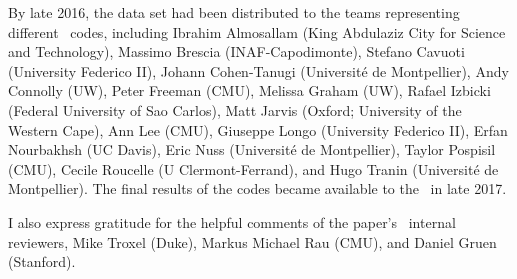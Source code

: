 By late 2016, the data set had been distributed to the teams representing different \pzpdf\ codes, including Ibrahim Almosallam (King Abdulaziz City for Science and Technology), Massimo Brescia (INAF-Capodimonte), Stefano Cavuoti (University Federico II), Johann Cohen-Tanugi (Universit\'e de Montpellier),  Andy Connolly (UW), Peter Freeman (CMU), Melissa Graham (UW), Rafael Izbicki (Federal University of Sao Carlos), Matt Jarvis (Oxford; University of the Western Cape), Ann Lee (CMU), Giuseppe Longo (University Federico II), Erfan Nourbakhsh (UC Davis), Eric Nuss (Universit\'e de Montpellier), Taylor Pospisil (CMU), Cecile Roucelle (U Clermont-Ferrand), and Hugo Tranin (Universit\'e de Montpellier).
The final results of the codes became available to the \pzwg\ in late 2017.

I also express gratitude for the helpful comments of the paper's \desc\ internal reviewers, Mike Troxel (Duke), Markus Michael Rau (CMU), and Daniel Gruen (Stanford).

